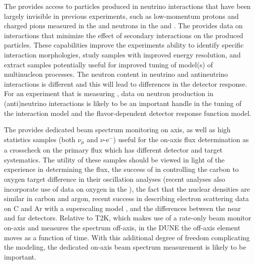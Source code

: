 The    provides access to particles produced in neutrino interactions that have been largely invisible in previous experiments, such as low-momentum protons and charged pions measured in the  and neutrons in the  and . The  provides data on interactions that minimize the effect of secondary interactions on the produced particles.  These capabilities improve the experiments ability to identify specific interaction morphologies, study samples with improved energy resolution, and extract samples potentially useful for improved tuning of model(s) of multinucleon processes. The neutron content in neutrino and antineutrino interactions is different and this will lead to differences in the detector response. For an experiment that is measuring , data on neutron production in (anti)neutrino interactions is likely to be an important handle in the tuning of the interaction model and the flavor-dependent detector response function model.


The  provides dedicated beam spectrum monitoring on axis, as well as high statistics samples (both $\nu_{\mu}$  and $\nu$-e$^{-}$) useful for the on-axis flux determination as a crosscheck on the primary flux which has different detector and target systematics.  The utility of these samples should be viewed in light of the  experience in determining the  flux, the success of  in controlling the carbon to oxygen target difference in their oscillation analyses (recent analyses also incorporate use of data on oxygen in the  ), the fact that the nuclear densities are similar in carbon and argon, recent success in describing electron scattering data on C and Ar with a superscaling model \cite{Barbaro:2019vsr}, and the differences between the near and far  detectors.  Relative to T2K, which makes use of a rate-only beam monitor on-axis and measures the spectrum off-axis, in the DUNE  the off-axis element moves as a function of time.  With this additional degree of freedom complicating the modeling, the dedicated on-axis beam spectrum measurement is likely to be important.

